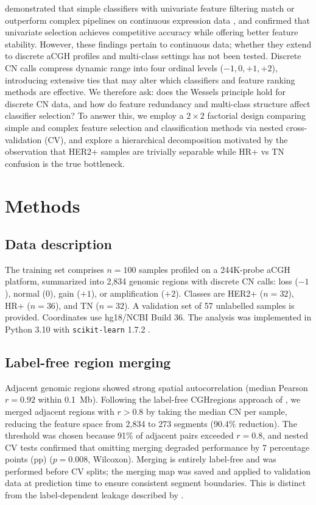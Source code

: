 \documentclass[11pt,a4paper,twocolumn]{article}
\begin{document}
\citet{wessels2005protocol} demonstrated that simple classifiers with univariate feature filtering match or outperform complex pipelines on continuous expression data \citep{vantveer2002gene}, and \citet{haury2011influence} confirmed that univariate selection achieves competitive accuracy while offering better feature stability. However, these findings pertain to continuous data; whether they extend to discrete aCGH profiles and multi-class settings has not been tested. Discrete CN calls compress dynamic range into four ordinal levels ($-1, 0, +1, +2$), introducing extensive ties that may alter which classifiers and feature ranking methods are effective. We therefore ask: does the Wessels principle hold for discrete CN data, and how do feature redundancy and multi-class structure affect classifier selection? To answer this, we employ a $2 \times 2$ factorial design comparing simple and complex feature selection and classification methods via nested cross-validation (CV), and explore a hierarchical decomposition motivated by the observation that HER2+ samples are trivially separable while HR+ vs TN confusion is the true bottleneck.

\section{Methods}
\label{sec:methods}

\subsection{Data description}
\label{sec:data}

The training set comprises $n = 100$ samples profiled on a 244K-probe aCGH platform, summarized into 2,834 genomic regions with discrete CN calls: loss ($-1$), normal ($0$), gain ($+1$), or amplification ($+2$). Classes are HER2+ ($n = 32$), HR+ ($n = 36$), and TN ($n = 32$). A validation set of 57 unlabelled samples is provided. Coordinates use hg18/NCBI Build 36. The analysis was implemented in Python 3.10 with \texttt{scikit-learn} 1.7.2 \citep{pedregosa2011sklearn}.

\subsection{Label-free region merging}
\label{sec:merging}

Adjacent genomic regions showed strong spatial autocorrelation (median Pearson $r = 0.92$ within 0.1~Mb). Following the label-free CGHregions approach of \citet{vanwieringen2007cghregions}, we merged adjacent regions with $r > 0.8$ by taking the median CN per sample, reducing the feature space from 2,834 to 273 segments (90.4\% reduction). The threshold was chosen because 91\% of adjacent pairs exceeded $r = 0.8$, and nested CV tests confirmed that omitting merging degraded performance by 7 percentage points (pp) ($p = 0.008$, Wilcoxon). Merging is entirely label-free and was performed before CV splits; the merging map was saved and applied to validation data at prediction time to ensure consistent segment boundaries. This is distinct from the label-dependent leakage described by \citet{ambroise2002selection}.
\end{document}
